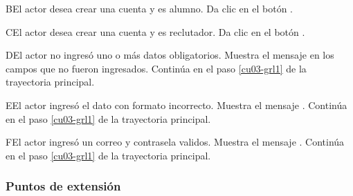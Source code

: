 \begin{UCtrayectoriaA}{B}{El actor desea crear una cuenta y es alumno.}
	\UCpaso [\UCactor] Da clic en el botón 
	.
\end{UCtrayectoriaA} 

\begin{UCtrayectoriaA}{C}{El actor desea crear una cuenta y es reclutador.}
	\UCpaso [\UCactor] Da clic en el botón 
	.
\end{UCtrayectoriaA} 

\begin{UCtrayectoriaA}{D}{El actor no ingresó uno o más datos obligatorios.}
	\UCpaso [\UCsist] Muestra el mensaje  en los campos que no
	fueron ingresados.
	\UCpaso [\UCsist] Continúa en el paso \ref{cu03-grl1} de la trayectoria principal.
\end{UCtrayectoriaA} 

\begin{UCtrayectoriaA}{E}{El actor ingresó el dato con formato incorrecto.}
	\UCpaso [\UCsist] Muestra el mensaje .
	\UCpaso [\UCsist] Continúa en el paso \ref{cu03-grl1} de la trayectoria principal.
\end{UCtrayectoriaA} 

\begin{UCtrayectoriaA}{F}{El actor ingresó un correo y contrasela validos.}
	\UCpaso [\UCsist] Muestra el mensaje .
	\UCpaso [\UCsist] Continúa en el paso \ref{cu03-grl1} de la trayectoria principal.
\end{UCtrayectoriaA} 




\subsubsection{Puntos de extensión}

